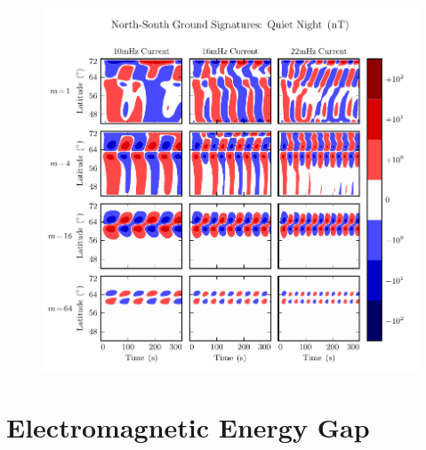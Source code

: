 \begin{figure}[H]
    \centering
    \includegraphics[width=\textwidth]{figures/BqE_J_4.pdf}
    \caption[North-South Ground Signatures: Quiet Night]{}
    \label{fig_BqE_J_4}
\end{figure}






\section{Electromagnetic Energy Gap}


